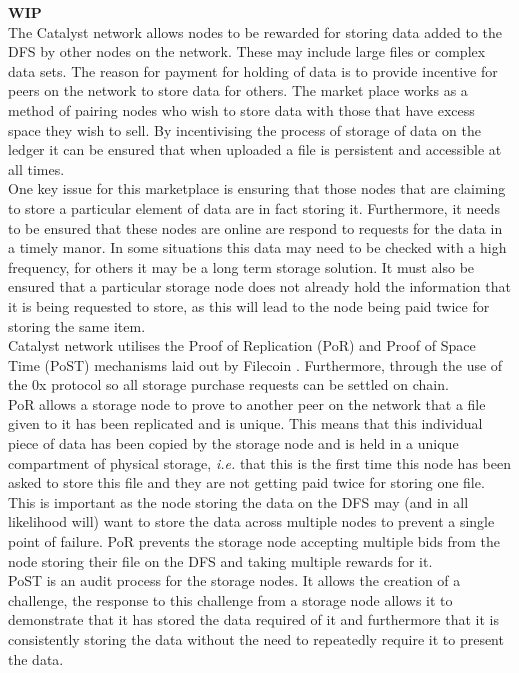 \textbf{WIP} \\

The Catalyst network allows nodes to be rewarded for storing data added to the DFS by other nodes on the network. These may include large files or complex data sets. The reason for payment for holding of data is to provide incentive for peers on the network to store data for others. The market place works as a method of pairing nodes who wish to store data with those that have excess space they wish to sell. By incentivising the process of storage of data on the ledger it can be ensured that when uploaded a file is persistent and accessible at all times. \\

One key issue for this marketplace is ensuring that those nodes that are claiming to store a particular element of data are in fact storing it. Furthermore, it needs to be ensured that these nodes are online are respond to requests for the data in a timely manor. In some situations this data may need to be checked with a high frequency, for others it may be a long term storage solution. It must also be ensured that a particular storage node does not already hold the information that it is being requested to store, as this will lead to the node being paid twice for storing the same item. \\

Catalyst network utilises the Proof of Replication (PoR) and Proof of Space Time (PoST) mechanisms laid out by Filecoin \cite{benet2018filecoin}. Furthermore, through the use of the 0x protocol \cite{warren20170x} so all storage purchase requests can be settled on chain.  \\

PoR allows a storage node to prove to another peer on the network that a file given to it has been replicated and is unique. This means that this individual piece of data has been copied by the storage node and is held in a unique compartment of physical storage, \textit{i.e.} that this is the first time this node has been asked to store this file and they are not getting paid twice for storing one file. This is important as the node storing the data on the DFS may (and in all likelihood will) want to store the data across multiple nodes to prevent a single point of failure. PoR prevents the storage node accepting multiple bids from the node storing their file on the DFS and taking multiple rewards for it. \\

PoST is an audit process for the storage nodes. It allows the creation of a challenge, the response to this challenge from a storage node allows it to demonstrate that it has stored the data required of it and furthermore that it is consistently storing the data without the need to repeatedly require it to present the data. 